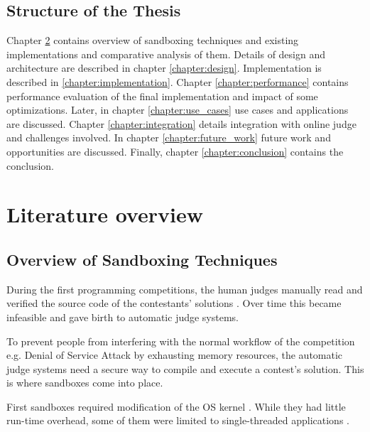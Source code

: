\documentclass[en]{pracamgr}
\begin{document}
\section{Structure of the Thesis}

Chapter \ref{chapter:literature_overview} contains overview of sandboxing techniques and existing implementations and comparative analysis of them. Details of design and architecture are described in chapter \ref{chapter:design}. Implementation is described in \ref{chapter:implementation}. Chapter \ref{chapter:performance} contains performance evaluation of the final implementation and impact of some optimizations. Later, in chapter \ref{chapter:use_cases} use cases and applications are discussed. Chapter \ref{chapter:integration} details integration with online judge and challenges involved. In chapter \ref{chapter:future_work} future work and opportunities are discussed. Finally, chapter \ref{chapter:conclusion} contains the conclusion.

\chapter{Literature overview}\label{chapter:literature_overview}

\section{Overview of Sandboxing Techniques}

During the first programming competitions, the human judges manually read and verified the source code of the contestants' solutions \cite{tochev2010validating}. Over time this became infeasible and gave birth to automatic judge systems.

To prevent people from interfering with the normal workflow of the competition e.g. Denial of Service Attack by exhausting memory resources, the automatic judge systems need a secure way to compile and execute a contest's solution. This is where sandboxes come into place.

First sandboxes required modification of the OS kernel \cite{provos2003improving, garfinkel2004janus, garfinkel2004ostia, jana2011txbox, li2014minibox}. While they had little run-time overhead, some of them were limited to single-threaded applications \cite{merry2009using}.
\end{document}
